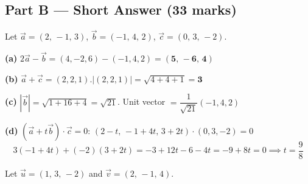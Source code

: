 \documentclass[addpoints]{exam}
\begin{document}
\begin{questions}
\section*{Part B --- Short Answer (33 marks)}

\question Let $\vec{a} = (2,\,-1,\,3)$, $\vec{b} = (-1,\,4,\,2)$, $\vec{c} = (0,\,3,\,-2)$.
\begin{solution}[9cm]
\textbf{(a)} $2\vec{a} - \vec{b} = (4,-2,6) - (-1,4,2) = \mathbf{(5,\,-6,\,4)}$

\textbf{(b)} $\vec{a} + \vec{c} = (2,2,1)$.\quad $|(2,2,1)| = \sqrt{4+4+1} = \mathbf{3}$

\textbf{(c)} $|\vec{b}| = \sqrt{1+16+4} = \sqrt{21}$.\quad
Unit vector $= \dfrac{1}{\sqrt{21}}(-1,4,2)$

\textbf{(d)} $(\vec{a}+t\vec{b})\cdot\vec{c} = 0$:
$(2-t,\,-1+4t,\,3+2t)\cdot(0,3,-2) = 0$
\[
3(-1+4t) + (-2)(3+2t) = -3+12t-6-4t = -9+8t = 0 \implies \boxed{t = \frac{9}{8}}
\]
\end{solution}

\question Let $\vec{u} = (1,\,3,\,-2)$ and $\vec{v} = (2,\,-1,\,4)$.
\end{questions}
\end{document}
